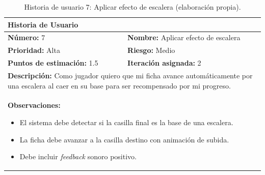 \begin{table}[H]
\centering
\caption{Historia de usuario 7: Aplicar efecto de escalera (elaboración propia).\label{tab:hu7}}
\renewcommand{\arraystretch}{1.5}
\begin{tabular}{|p{}|p{}|}
\hline
\multicolumn{2}{|l|}{\textbf{Historia de Usuario}} \\
\hline
\textbf{Número:} 7 & \textbf{Nombre:} Aplicar efecto de escalera \\
\hline
\textbf{Prioridad:} Alta & \textbf{Riesgo:} Medio \\
\hline
\textbf{Puntos de estimación:} 1.5 & \textbf{Iteración asignada:} 2 \\
\hline
\multicolumn{2}{|p{0.945\textwidth}|}{\textbf{Descripción:} Como jugador quiero que mi ficha avance automáticamente por una escalera al caer en su base para ser recompensado por mi progreso.} \\
\hline
\multicolumn{2}{|p{0.945\textwidth}|}{\textbf{Observaciones:}
\vspace{-0.5em}
\begin{itemize}
    \setlength\itemsep{0em}
    \item El sistema debe detectar si la casilla final es la base de una escalera.
    \item La ficha debe avanzar a la casilla destino con animación de subida.
    \item Debe incluir \textit{feedback} sonoro positivo.
\end{itemize}
\vspace{-1em}
} \\
\hline
\end{tabular}
\end{table}

